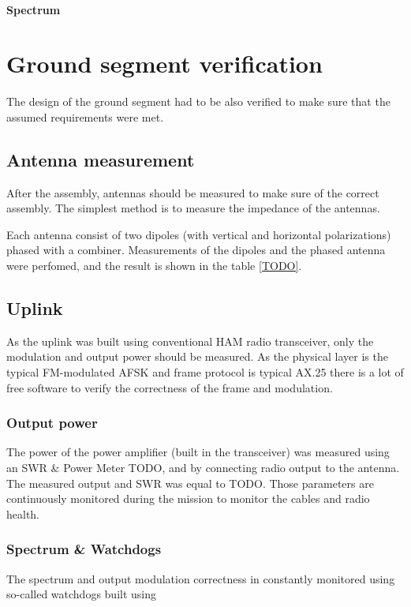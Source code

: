 \subsubsection{Spectrum}



\chapter{Ground segment verification}
The design of the ground segment had to be also verified to make sure that the assumed requirements were met.

\section{Antenna measurement}
After the assembly, antennas should be measured to make sure of the correct assembly. The simplest method is to measure the impedance of the antennas.

Each antenna consist of two dipoles (with vertical and horizontal polarizations) phased with a combiner. Measurements of the dipoles and the phased antenna were perfomed, and the result is shown in the table \ref{TODO}.


\section{Uplink}
As the uplink was built using conventional HAM radio transceiver, only the modulation and output power should be measured. As the physical layer is the typical FM-modulated AFSK and frame protocol is typical AX.25 there is a lot of free software to verify the correctness of the frame and modulation.

\subsection{Output power}
The power of the power amplifier (built in the transceiver) was measured using an SWR \& Power Meter TODO, and by connecting radio output to the antenna. The measured output and SWR was equal to TODO. Those parameters are continuously monitored during the mission to monitor the cables and radio health.

\subsection{Spectrum \& Watchdogs}
The spectrum and output modulation correctness in constantly monitored using so-called watchdogs built using